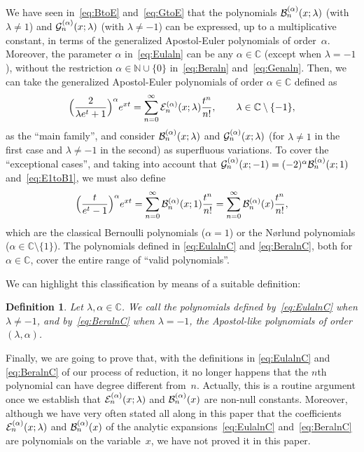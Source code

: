 \documentclass[11pt,a4paper]{amsart}
\newcommand{\N}{\mathbb{N}}
\newcommand{\C}{\mathbb{C}}
\newcommand{\B}[1][]{\mathcal{B}\ifx#1\empty\else^{(#1)}\fi}
\newcommand{\E}[1][]{\mathcal{E}\ifx#1\empty\else^{(#1)}\fi}
\newcommand{\G}[1][]{\mathcal{G}\ifx#1\empty\else^{(#1)}\fi}
\theoremstyle{plain}
\theoremstyle{plain}
\newtheorem{definition}[theor]{Definition}
\theoremstyle{plain}
\begin{document}
We have seen in~\eqref{eq:BtoE} and~\eqref{eq:GtoE} that the polynomials $\B[\alpha]_{n}(x;\lambda)$ (with $\lambda\ne1$) and $\G[\alpha]_{n}(x;\lambda)$ (with $\lambda\ne-1$) can be expressed, up to a multiplicative constant, in terms of the generalized Apostol-Euler polynomials of order~$\alpha$. Moreover, the parameter $\alpha$ in~\eqref{eq:Eulaln} can be any $\alpha \in \C$ (except when $\lambda=-1$), without the restriction $\alpha \in \N \cup \{0\}$ in~\eqref{eq:Beraln} and~\eqref{eq:Genaln}. Then, we can take the generalized Apostol-Euler polynomials of order $\alpha \in \C$ 
defined as
\begin{equation}
\label{eq:EulalnC}
  \Big( \frac{2}{\lambda e^t+1} \Big)^\alpha e^{xt} = \sum_{n=0}^{\infty} \E[\alpha]_{n}(x;\lambda) \frac{t^n}{n!}, 
  \qquad \lambda \in \C \setminus \{-1\},
\end{equation}
as the ``main family'', and consider $\B[\alpha]_{n}(x;\lambda)$ and $\G[\alpha]_{n}(x;\lambda)$ (for $\lambda \ne 1$ in the first case and $\lambda \ne -1$ in the second) as superfluous variations. 
To cover the ``exceptional cases'', 
and taking into account that $\G[\alpha]_n(x;-1) = (-2)^\alpha\B[\alpha]_n(x;1)$ and~\eqref{eq:E1toB1}, we must also define
\begin{equation}
\label{eq:BeralnC}
  \Big( \frac{t}{e^t-1} \Big)^\alpha e^{xt} 
  = \sum_{n=0}^{\infty} \B[\alpha]_{n}(x;1) \frac{t^n}{n!}
  = \sum_{n=0}^{\infty} \B[\alpha]_{n}(x) \frac{t^n}{n!},
\end{equation}
which are the classical Bernoulli polynomials ($\alpha=1$) or the N{\o}rlund polynomials ($\alpha \in \C \setminus \{1\}$).
The polynomials defined in \eqref{eq:EulalnC} and \eqref{eq:BeralnC}, both for $\alpha \in \C$,
cover the entire range of ``valid polynomials''. 


We can highlight this classification by means of a suitable definition:

\begin{definition}
\label{def:reduction}
Let $\lambda, \alpha \in \C$. We call the polynomials defined by~\eqref{eq:EulalnC} when $\lambda \ne -1$, and by~\eqref{eq:BeralnC} when $\lambda = -1$, the Apostol-like polynomials of order $(\lambda,\alpha)$.
\end{definition}


Finally, we are going to prove that, with the definitions in \eqref{eq:EulalnC} and \eqref{eq:BeralnC} of our process of reduction, it no longer happens that the $n$th polynomial can have degree different from~$n$. Actually, this is a routine argument once we establish that $\E[\alpha]_{n}(x;\lambda)$ and $\B[\alpha]_{n}(x)$ are non-null constants. Moreover, although we have very often stated all along in this paper that the coefficients $\E[\alpha]_{n}(x;\lambda)$ and $\B[\alpha]_{n}(x)$ of the analytic expansions~\eqref{eq:EulalnC} and~\eqref{eq:BeralnC} are polynomials on the variable~$x$, we have not proved it in this paper. 
\end{document}
